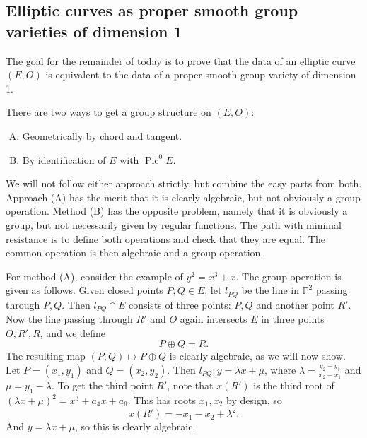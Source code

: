 \subsection{Elliptic curves as proper smooth group varieties of dimension 1}
The goal for the remainder of today is to prove that the data of an elliptic curve \( (E,O) \) is equivalent to the data of a proper smooth group variety of dimension 1.

There are two ways to get a group structure on \( (E,O) \):
\begin{enumerate}[(A)]
\item Geometrically by chord and tangent.
\item By identification of \( E  \)  with \( \operatorname{Pic}^0 E \).
\end{enumerate}
We will not follow either approach strictly, but combine the easy parts from both.
Approach (A) has the merit that it is clearly algebraic, but not obviously a group operation.
Method (B) has the opposite problem, namely that it is obviously a group, but not necessarily given by regular functions.
The path with minimal resistance is to define both operations and check that they are equal. The common operation is then algebraic and a group operation.

For method (A), consider the example of \( y^2 = x^3 + x \).
The group operation is given as follows. Given closed points \( P, Q \in E \), let \( l_{PQ} \) be the line in \( \mathbb{P}^2 \) passing through \( P,Q \). Then \( l_{PQ} \cap E \) consists of three points: \( P,Q \) and another point \( R' \). Now the line passing through \( R' \) and \( O \) again intersects \( E \) in three points \( O, R', R \), and we define \[ P \oplus Q = R . \]
The resulting map \( \left( P,Q \right) \mapsto P \oplus Q \) is clearly algebraic, as we will now show.
Let \( P = (x_1,y_1) \) and \( Q = (x_2,y_2) \). Then \( l_{PQ} : y =\lambda x + \mu \), where \( \lambda = \frac{y_2 - y_1}{x_2 - x_1} \) and \( \mu = y_1 - \lambda  \).
To get the third point \( R' \), note that \( x(R') \) is the third root of
\( (\lambda x + \mu)^2 = x^3 + a_4 x + a_6 . \)
This has roots \( x_1,x_2 \) by design, so \[ x(R') = - x_1 - x_2 + \lambda^2 . \]
And \( y =\lambda x +\mu \), so this is clearly algebraic.


